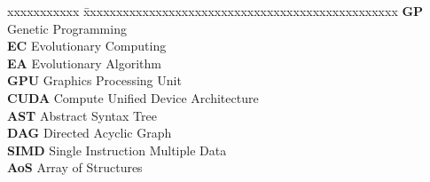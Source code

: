 \abbreviations
 
\noindent 
\begin{tabbing}
xxxxxxxxxxx \= xxxxxxxxxxxxxxxxxxxxxxxxxxxxxxxxxxxxxxxxxxxxxxxx \kill
\textbf{GP}     \> Genetic Programming \\
\textbf{EC}     \> Evolutionary Computing \\
\textbf{EA}     \> Evolutionary Algorithm \\
\textbf{GPU}    \> Graphics Processing Unit \\
\textbf{CUDA}   \> Compute Unified Device Architecture \\
\textbf{AST}    \> Abstract Syntax Tree \\
\textbf{DAG}    \> Directed Acyclic Graph \\
\textbf{SIMD} \> Single Instruction Multiple Data \\
\textbf{AoS} \> Array of Structures \\
\end{tabbing}

